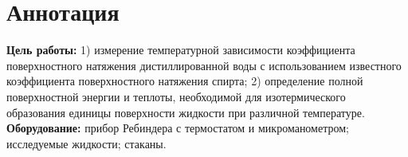 \section{Аннотация}
\textbf{Цель работы:} 1) измерение температурной зависимости  коэффициента поверхностного натяжения дистиллированной воды с использованием известного коэффициента поверхностного натяжения спирта;  2) определение полной поверхностной энергии  и теплоты, необходимой для изотермического образования единицы  поверхности жидкости  при различной температуре. 
\textbf{Оборудование:} прибор  Ребиндера  с термостатом и микроманометром; исследуемые жидкости; стаканы.